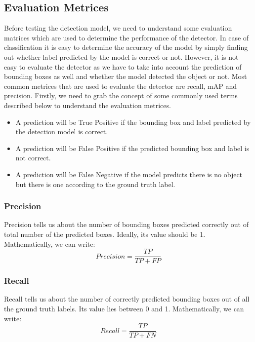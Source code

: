 \subsection{Evaluation Metrices}
Before testing the detection model, we need to understand some evaluation matrices which are used to determine the performance of the detector. In case of classification it is easy to determine the accuracy of the model by simply finding out whether label predicted by the model is correct or not. However, it is not easy to evaluate the detector as we have to take into account the prediction of bounding boxes as well and whether the model detected the object or not. Most common metrices that are used to evaluate the detector are recall, mAP and precision. Firstly, we need to grab the concept of some commonly used terms described below to understand the evaluation metrices.
\begin{itemize}
    \item  A prediction will be True Positive if the bounding box and label predicted by the detection model is correct.
    \item A prediction will be False Positive if the predicted bounding box and label is not correct.
    \item A prediction will be False Negative if the model predicts there is no object but there is one according to the ground truth label.
\end{itemize}
\subsubsection{Precision}
Precision tells us about the number of bounding boxes predicted correctly out of total number of the predicted boxes. Ideally, its value should be 1. Mathematically, we can write:
\begin{equation}
    Precision = \frac{TP}{TP + FP}
\end{equation}
\subsubsection{Recall}
Recall tells us about the number of correctly predicted bounding boxes out of all the ground truth labels. Its value lies between 0 and 1. Mathematically, we can write:
\begin{equation}
    Recall = \frac{TP}{TP + FN}
\end{equation}
